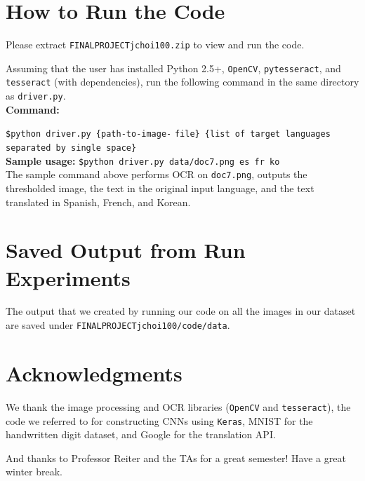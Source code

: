 \documentclass[11pt,letterpaper]{article}
\begin{document}
\section*{How to Run the Code}

Please extract {\tt FINAL\textunderscore PROJECT\textunderscore jchoi100.zip} to view and run the code.

Assuming that the user has installed Python 2.5+, {\tt OpenCV}, {\tt pytesseract}, and {\tt tesseract} (with dependencies), run the following command in the same directory as {\tt driver.py}.\\

\textbf{Command:}

{\tt \$python driver.py \{path-to-image-} {\tt file\} \{list of target languages separated by single space\}}\\

\textbf{Sample usage:} {\tt \$python driver.py data/doc7.png es fr ko}\\

The sample command above performs OCR on {\tt doc7.png}, outputs the thresholded image, the text in the original input language, and the text translated in Spanish, French, and Korean.

\section*{Saved Output from Run Experiments}

The output that we created by running our code on all the images in our dataset are saved under {\tt FINAL\textunderscore PROJECT\textunderscore jchoi100/code/data}.

\section*{Acknowledgments}

We thank the image processing and OCR libraries ({\tt OpenCV} and {\tt tesseract}), the code we referred to for constructing CNNs using {\tt Keras},  MNIST for the handwritten digit dataset, and Google for the translation API.

And thanks to Professor Reiter and the TAs for a great semester! Have a great winter break.
\end{document}
